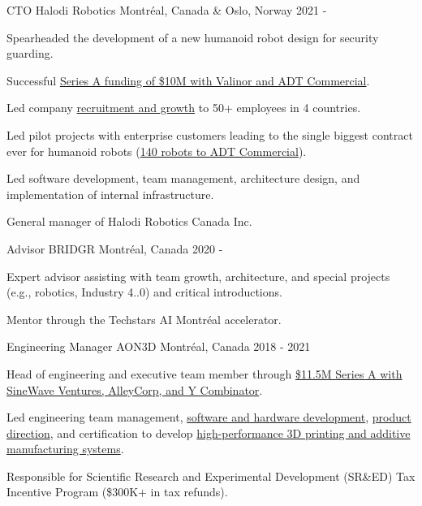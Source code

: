 \begin{cventries}

    \cventry
    {CTO}
    {Halodi Robotics}
    {Montréal, Canada \& Oslo, Norway}
    {2021 - }
    {
        \begin{cvitems}
            \item{Spearheaded the development of a new humanoid robot design for security guarding.}
            \item{Successful \href{https://www.halodi.com/press-releases/adt-invests-in-and-partners-with-halodi-robotics-lbz49}{Series A funding of \$10M with Valinor and ADT Commercial}.}
            \item{Led company \href{https://www.nicholasnadeau.com/talk/society-robots-and-us-hiring-for-inclusive-robotics/}{recruitment and growth} to 50+ employees in 4 countries.}
            \item{Led pilot projects with enterprise customers leading to the single biggest contract ever for humanoid robots (\href{https://www.halodi.com/press-releases/halodi-robotics-inks-contract-with-adt-commercial-for-delivery-of-140-humanoid-robots}{140 robots to ADT Commercial}).}
            \item{Led software development, team management, architecture design, and implementation of internal infrastructure.}
            \item{General manager of Halodi Robotics Canada Inc.}
        \end{cvitems}
    }

    \cventry
    {Advisor}
    {BRIDGR}
    {Montréal, Canada}
    {2020 - }
    {
        \begin{cvitems}
            \item{Expert advisor assisting with team growth, architecture, and special projects (e.g., robotics, Industry 4..0) and critical introductions.}
            \item{Mentor through the Techstars AI Montréal accelerator.}
        \end{cvitems}
    }

    \cventry
    {Engineering Manager}
    {AON3D}
    {Montréal, Canada}
    {2018 - 2021}
    {
        \begin{cvitems}
            \item{Head of engineering and executive team member through \href{https://techcrunch.com/2021/09/02/3d-printing-startup-aon3d-closes-11-5m-series-a/}{\$11.5M Series A with SineWave Ventures, AlleyCorp, and Y Combinator}.}
            \item{Led engineering team management, \href{https://www.nicholasnadeau.com/talk/making-materials-matter/}{software and hardware development}, \href{https://www.nicholasnadeau.com/talk/the-products-by-design-podcast/}{product direction}, and certification to develop \href{https://www.aon3d.com/}{high-performance 3D printing and additive manufacturing systems}.}
            \item{Responsible for Scientific Research and Experimental Development (SR\&ED) Tax Incentive Program (\$300K+ in tax refunds).}
        \end{cvitems}
    }


\end{cventries}
